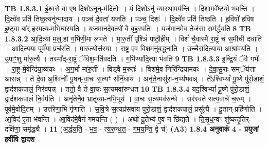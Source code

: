 \documentclass[17pt]{extarticle}
\begin{document}
                                \textbf{ TB 1.8.3.1} \newline
                  ई॒श्व॒रो वा ए॒ष दिशोऽनून्-म॑दितोः । यं दिशोऽनु॑ व्यास्था॒पय॑न्ति । दि॒शामवे᳚ष्टयो भवन्ति । दि॒क्ष्वे॑व प्रति॑ तिष्ठ॒त्यनु॑न्मादाय । पञ्च॑ दे॒वता॑ यजति । पञ्च॒ दिशः॑ । दि॒क्ष्वे॑व प्रति॑ तिष्ठति । ह॒विषो॑ हविष इ॒ष्ट्वा बा॑र्.हस्प॒त्य-म॒भिघा॑रयति । य॒ज॒मा॒न॒दे॒व॒त्यो॑ वै बृह॒स्पतिः॑ । यज॑मानमे॒व तेज॑सा॒ सम॑र्द्धयति \textbf{ 8} \newline
                  \newline
                                \textbf{ TB 1.8.3.2} \newline
                  आ॒दि॒त्यां म॒ल्॒.हां ग॒र्भिणी॒मा ल॑भते । मा॒रु॒तीं पृश्ञिं॑ पष्ठौ॒हीम् । विशं॑ चै॒वास्मै॑ रा॒ष्ट्रं च॑ स॒मीची॑ दधाति । आ॒दि॒त्यया॒ पूर्व॑या॒ प्रच॑रति । मा॒रु॒त्योत्त॑रया । रा॒ष्ट्र ए॒व विश॒मनु॑बद्ध्नाति । उ॒च्चैरा॑दि॒त्याया॒ आश्रा॑वयति । उ॒पाꣳ॒॒शु मा॑रु॒त्यै । तस्मा᳚द्-रा॒ष्ट्रं ॅविश॒मति॑वदति । ग॒र्भिण्या॑दि॒त्या भ॑वति \textbf{ 9} \newline
                  \newline
                                \textbf{ TB 1.8.3.3} \newline
                  इ॒न्द्रि॒यं ॅवै गर्भः॑ । रा॒ष्ट्र-मे॒वेन्द्रि॑या॒व्य॑कः । अ॒ग॒र्भा मा॑रु॒ती । विड्वै म॒रुतः॑ । विश॑मे॒व निरि॑न्द्रियामकः । दे॒वा॒सु॒राः सम्ॅय॑त्ता आसन्न् । ते दे॒वा अ॒श्विनोः᳚ पू॒षन्-वा॒चः स॒त्यꣳ स॑निं॒धाय॑ । अनृ॑ते॒नासु॑रा-न॒भ्य॑भवन्न् । ते᳚ऽश्विभ्यां᳚ पू॒ष्णे पु॑रो॒डाशं॒ द्वाद॑शकपालं॒ निर॑वपन्न् । ततो॒ वै ते वा॒चः स॒त्यमवा॑रुन्धत \textbf{ 10} \newline
                  \newline
                                \textbf{ TB 1.8.3.4} \newline
                  यद॒श्विभ्यां᳚ पू॒ष्णे पु॑रो॒डाशं॒ द्वाद॑शकपालं नि॒र्वप॑ति । अनृ॑तेनै॒व भ्रातृ॑व्या-नभि॒भूय॑ । वा॒चः स॒त्यमव॑रुन्धे । सर॑स्वते सत्य॒वाचे॑ च॒रुम् । पूर्व॑मे॒वोदि॒तम् । उत्त॑रेणा॒भि गृ॑णाति । स॒वि॒त्रे स॒त्यप्र॑सवाय पुरो॒डाशं॒ द्वाद॑शकपालं॒ प्रसू᳚त्यै । दू॒तान्-प्रहि॑णोति । आ॒विद॑ ए॒ता भ॑वन्ति । आ॒विद॑मे॒वैनं॑ गमयन्ति ( ) । अथो॑ दू॒तेभ्य॑ ए॒व न छि॑द्यते । ति॒सृ॒ध॒न्वꣳ शु॑ष्कदृ॒तिर्-दक्षि॑णा॒ समृ॑द्ध्यै । \textbf{ 11} \newline
                  \newline
                                    (अ॒र्द्ध॒य॒ति॒ - भ॒व॒ - त्य॒रु॒न्ध॒त॒ - ग॒म॒य॒न्ति॒ द्वे च॑) \textbf{(A3)} \newline \newline
                \textbf{ 1.8.4     अनुवाकं   4 - प्रयुजां हवींषि द्वादश} \newline
\end{document}
